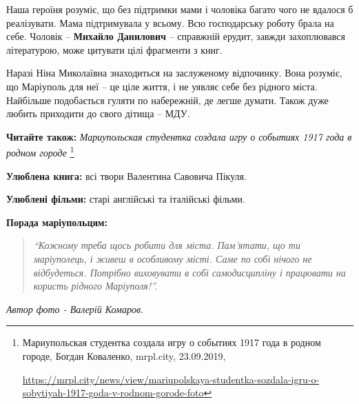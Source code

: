 Наша героїня розуміє, що без підтримки мами і чоловіка багато чого не вдалося б
реалізувати. Мама підтримувала у всьому. Всю господарську роботу брала на себе.
Чоловік – \textbf{Михайло Данилович} – справжній ерудит, завжди захоплювався
літературою, може цитувати цілі фрагменти з книг.

Наразі Ніна Миколаївна знаходиться на заслуженому відпочинку. Вона розуміє, що
Маріуполь для неї – це ціле життя, і не уявляє себе без рідного міста.
Найбільше подобається гуляти по набережній, де легше думати. Також дуже любить
приходити до свого дітища – МДУ.

\textbf{Читайте також:} \emph{Мариупольская студентка создала игру о событиях 1917 года в родном городе}%
\footnote{Мариупольская студентка создала игру о событиях 1917 года в родном городе, Богдан Коваленко, mrpl.city, 23.09.2019, \par%
\url{https://mrpl.city/news/view/mariupolskaya-studentka-sozdala-igru-o-sobytiyah-1917-goda-v-rodnom-gorode-foto}
}

\textbf{Улюблена книга:} всі твори Валентина Савовича Пікуля.

\textbf{Улюблені фільми:} старі англійські та італійські фільми.

\textbf{Порада маріупольцям:} 

\begin{quote}
\em\enquote{Кожному треба щось робити для міста. Пам'ятати, що ти маріуполець, і живеш в
особливому місті. Саме по собі нічого не відбудеться. Потрібно виховувати в
собі самодисципліну і працювати на користь рідного Маріуполя!}.
\end{quote}

\emph{Автор фото - Валерій Комаров}.
